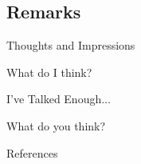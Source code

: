 \documentclass{beamer}
\begin{document}
\subsection{Remarks}

\begin{frame}{Thoughts and Impressions}

  \Huge What do I think?

\end{frame}


\begin{frame}{I've Talked Enough$\ldots$}

  \Huge What do you think?

\end{frame}


\setbeamercovered{}
\beamerdefaultoverlayspecification{}

\begin{frame}[c,allowframebreaks]{References}

\small

\nocite{*}

\itemize

\end{frame}

\end{document}
